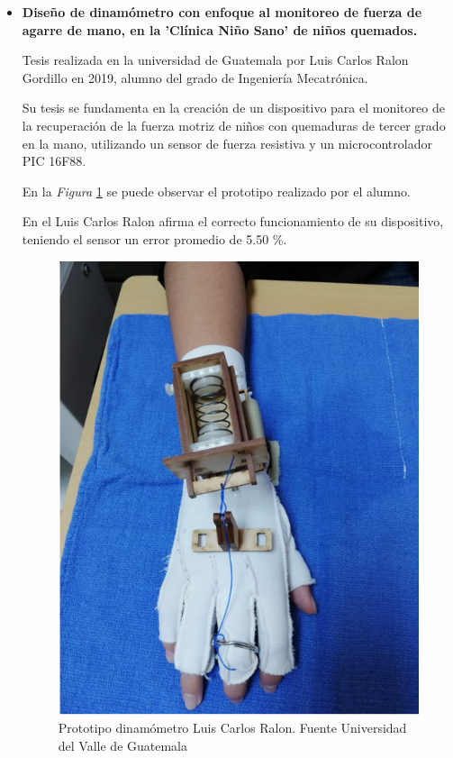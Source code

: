 \begin{itemize}
Mayra Lasteña Millingalli Ortega et al, en su artículo de revisión llamado 'Uso del dinamómetro para mejorar la fuerza de la mano del adulto mayor' publicado en la Revista Científica Arbitrada Multidisciplinaria PENTACIENCIAS en Octubre de 2023, realizan un trabajo de investigación revisando artículos en inglés y español publicados entre 2013 y 2022.
La población de estudio son pacientes geriátricos tratados en Terapia Ocupacional, las investigadoras exponen que actualmente en estas sesiones de terapia los pacientes son evaluados mediante métodos manuales como las escalas de registros, afirman que estos métodos son rudimentarios y no evidentes. \cite{Articulo_din}\footnote{Artículo que habla sobre el uso del dinamómetro\cite{Articulo_din}.}
\item \textbf{Diseño de dinamómetro con enfoque al monitoreo de fuerza de agarre de mano, en la 'Clínica Niño Sano' de niños quemados.}

    Tesis realizada en la universidad de Guatemala por Luis Carlos Ralon Gordillo en 2019, alumno del grado de  Ingeniería Mecatrónica. 

    Su tesis se fundamenta en la creación de un dispositivo para el monitoreo de la recuperación de la fuerza motriz de niños con quemaduras de tercer grado en la mano, utilizando un sensor de fuerza resistiva y un  microcontrolador PIC 16F88.

    En la \textit{Figura} \ref{fig:Prototipo dinamómetro Luis} se puede observar el prototipo realizado por el alumno.

    En el Luis Carlos Ralon afirma el correcto funcionamiento de su dispositivo, teniendo el sensor un  error promedio de 5.50 \%.

    \begin{figure}
        \centering
        \includegraphics[width=0.5\linewidth]{img/TesisGuatemala.png}
        \caption{Prototipo dinamómetro Luis Carlos Ralon. Fuente Universidad del Valle de Guatemala }
        \label{fig:Prototipo dinamómetro Luis}
    \end{figure}    
\end{itemize}
